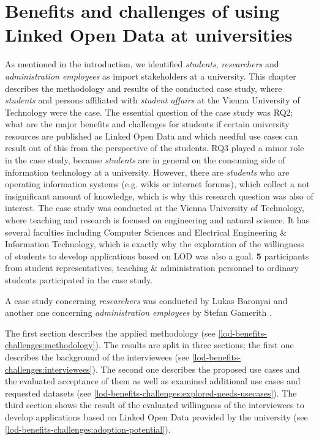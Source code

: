 \documentclass{article}
\begin{document}
\section{Benefits and challenges of using Linked Open Data at universities}
\label{lod-benefits-challenges}
As mentioned in the introduction, we identified \textit{students}, \textit{researchers} and \textit{administration employees} as import stakeholders at a university. This chapter describes the methodology and results of the conducted case study, where \textit{students} and persons affiliated with \textit{student affairs} at the Vienna University of Technology were the case. The essential question of the case study was RQ2; what are the major benefits and challenges for students if certain university resources are published as Linked Open Data and which needful use cases can result out of this from the perspective of the students. RQ3 played a minor role in the case study, because \textit{students} are in general on the consuming side of information technology at a university. However, there are \textit{students} who are operating information systems (e.g. wikis or internet forums), which collect a not insignificant amount of knowledge, which is why this research question was also of interest. The case study was conducted at the Vienna University of Technology, where teaching and research is focused on engineering and natural science.  It has several faculties including Computer Sciences and Electrical Engineering \& Information Technology, which is exactly why the exploration of the willingness of students to develop applications based on LOD was also a goal. \textbf{5} participants from student representatives, teaching \& administration personnel to ordinary students participated in the case study.

A case study concerning \textit{researchers} was conducted by Lukas Baronyai \cite{baronyai_publishing_2016} and another one concerning \textit{administration employees} by Stefan Gamerith \cite{gamerith_linked_2016}. 

The first section describes the applied methodology (see \ref{lod-benefits-challenges:methodology}). The results are split in three sections; the first one describes the background of the interviewees (see \ref{lod-benefits-challenges:interviewees}). The second one describes the proposed use cases and the evaluated acceptance of them as well as examined additional use cases and requested datasets (see \ref{lod-benefits-challenges:explored-needs-usecases}). The third section shows the result of the evaluated willingness of the interviewees to develop applications based on Linked Open Data provided by the university (see \ref{lod-benefits-challenges:adoption-potential}).
\end{document}
